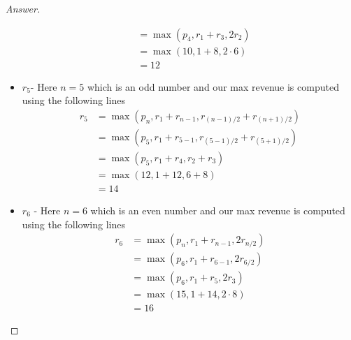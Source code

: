 \documentclass[11pt]{article}
\theoremstyle{definition}
\theoremstyle{definition}
\theoremstyle{definition}
\begin{document}
\begin{proof}[Answer]
\begin{itemize}
\begin{align*}
             &= \max(p_4, r_1 + r_{3}, 2r_{2}) \\
             &= \max(10, 1 + 8, 2\cdot6) \\
             &= 12
        \end{align*}
    \item $r_5$- Here $n=5$ which is an odd number and our max revenue is computed using the following lines 
        \begin{align*}
            r_5 &= \max(p_n, r_1 + r_{n-1}, r_{(n-1)/2} + r_{(n+1)/2}) \\
            &= \max(p_5, r_1 + r_{5-1}, r_{(5-1)/2} + r_{(5+1)/2}) \\
            &= \max(p_5, r_1 + r_{4}, r_{2} + r_{3}) \\
            &= \max(12, 1 + 12, 6 + 8) \\
            &= 14
        \end{align*}
    \item $r_6$ - Here $n=6$ which is an even number and our max revenue is computed using the following lines 
        \begin{align*}
            r_6 &= \max(p_n, r_1 + r_{n-1}, 2r_{n/2}) \\
            &= \max(p_6, r_1 + r_{6-1}, 2r_{6/2}) \\
            &= \max(p_6, r_1 + r_{5}, 2r_{3}) \\
            &= \max(15, 1 + 14, 2\cdot 8) \\
            &= 16
        \end{align*}
\end{itemize}
\end{proof}

\end{document}

